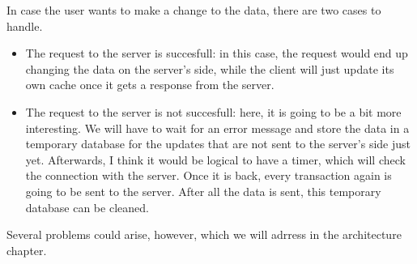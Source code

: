 In case the user wants to make a change to the data, there are two cases to handle. 

\begin{itemize}
\item{The request to the server is succesfull: in this case, the request would end up changing the data on the server's side, while the client will just update its own cache once it gets a response from the server.}
\item{The request to the server is not succesfull: here, it is going to be a bit more interesting. We will have to wait for an error message and store the data in a temporary database for the updates that are not sent to the server's side just yet. Afterwards, I think it would be logical to have a timer, which will check the connection with the server. Once it is back, every transaction again is going to be sent to the server. After all the data is sent, this temporary database can be cleaned. }

\end{itemize}

Several problems could arise, however, which we will adrress in the architecture chapter.